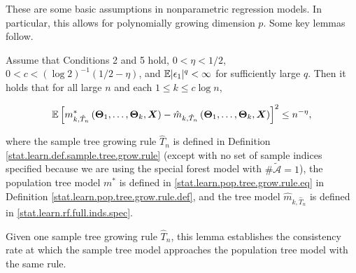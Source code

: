 These are some basic assumptions in nonparametric regression models. In particular, this allows for polynomially growing dimension \(p\). Some key lemmas follow.

\begin{lemma}

Assume that Conditions 2 and 5 hold, \(0 < \eta < 1/2\), \(0 < c < (\log 2)^{-1}(1/2 - \eta)\), and \(\mathbb{E} |\epsilon_1|^q < \infty\) for sufficiently large \(q\). Then it holds that for all large \(n\) and each \(1 \leq k \leq c \log n\),

\[
\mathbb{E} \left[  m_{k, \hat{T}_n}^*\left( \boldsymbol{\Theta}_1, \ldots, \boldsymbol{\Theta}_k, \boldsymbol{X} \right)  - \hat{m}_{k, \hat{T}_n}\left( \boldsymbol{\Theta}_1, \ldots, \boldsymbol{\Theta}_k, \boldsymbol{X} \right)  \right]^2 \leq n^{-\eta},
\]

where the sample tree growing rule \(\hat{T}_n\) is defined in Definition \ref{stat.learn.def.sample.tree.grow.rule} (except with no set of sample indices specified because we are using the special forest model with \(\# \tilde{\mathcal{A}} = 1\)), the population tree model \(m^*\) is defined in \eqref{stat.learn.pop.tree.grow.rule.eq} in Definition \ref{stat.learn.pop.tree.grow.rule.def}, and the tree model \(\hat{m}_{k, \hat{T}_n}\) is defined in \eqref{stat.learn.rf.full.inds.spec}.

\end{lemma}

Given one sample tree growing rule \(\hat{T}_n\), this lemma establishes the consistency rate at which the sample tree model approaches the population tree model with the same rule.

